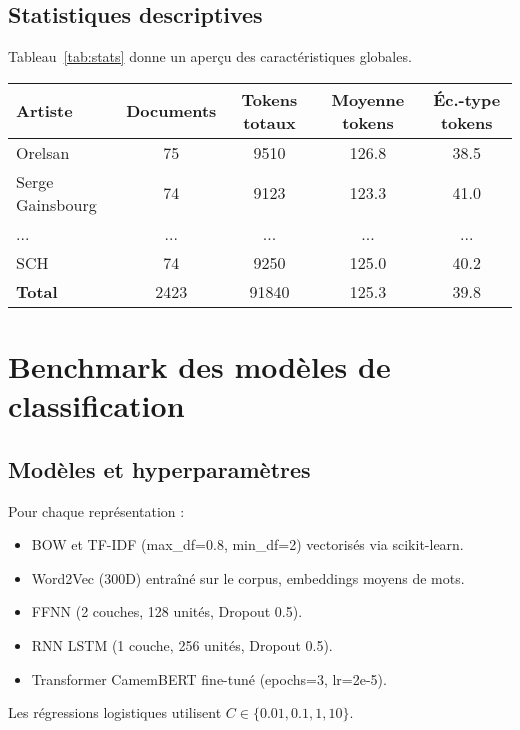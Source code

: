 \documentclass[a4paper,11pt]{article}
\begin{document}
\clearpage

\subsection{Statistiques descriptives}
Tableau~\ref{tab:stats} donne un aperçu des caractéristiques globales.
\begin{center}
\label{tab:stats}
\begin{tabular}{lS[table-format=4]S[table-format=4]S[table-format=3.1]S[table-format=3.1]}
\toprule
Artiste           & {Documents} & {Tokens totaux} & {Moyenne tokens} & {Éc.-type tokens} \\
\midrule
Orelsan           &    75 & 9510  & 126.8 & 38.5 \\
Serge Gainsbourg  &    74 & 9123  & 123.3 & 41.0 \\
...               &   ... & ...   & ...   & ...  \\
SCH               &    74 & 9250  & 125.0 & 40.2 \\
\midrule
\textbf{Total}    &   2423 & 91840 & 125.3 & 39.8 \\
\bottomrule
\end{tabular}

\end{center}
\section{Benchmark des modèles de classification}
\subsection{Modèles et hyperparamètres}
Pour chaque représentation :
\begin{itemize}
  \item BOW et TF-IDF (max\_df=0.8, min\_df=2) vectorisés via scikit-learn.
  \item Word2Vec (300D) entraîné sur le corpus, embeddings moyens de mots.
  \item FFNN (2 couches, 128 unités, Dropout 0.5).
  \item RNN LSTM (1 couche, 256 unités, Dropout 0.5).
  \item Transformer CamemBERT fine-tuné (epochs=3, lr=2e-5).
\end{itemize}

Les régressions logistiques utilisent $C\in\{0.01, 0.1, 1, 10\}$.
\end{document}
